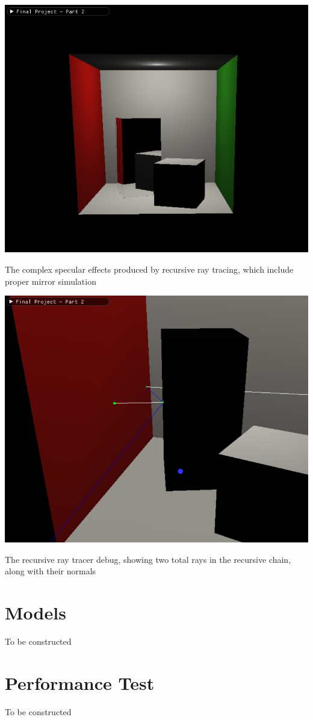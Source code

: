 \documentclass{article}
\begin{document}
    \begin{center}

        \includegraphics[scale=0.60]{images/recursive_ray_tracer_showcase.png}

        The complex specular effects produced by recursive ray tracing, which include proper mirror simulation

        \includegraphics[scale=0.60]{images/recursive_ray_tracer_debug.png}

        The recursive ray tracer debug, showing two total rays in the recursive chain, along with their normals
    \end{center}

    \section{Models}
    To be constructed

    \section{Performance Test}
    To be constructed
\end{document}
